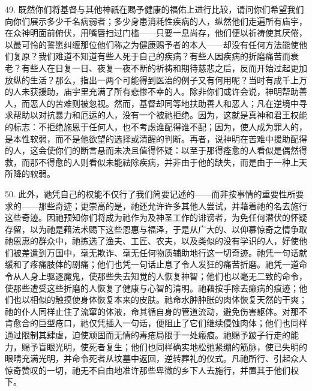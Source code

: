 49. 既然你们将基督与其他神祇在赐予健康的福佑上进行比较，请问你们希望我们向你们展示多少千名病弱者；多少身患消耗性疾病的人，纵然他们走遍所有庙宇，在众神明面前俯伏，用嘴唇扫过门槛——只要一息尚存，他们便以祈祷使其厌倦，以最可怜的誓愿纠缠那位他们称之为健康赐予者的本人——却没有任何方法能使他们复原？我们难道不知道有些人死于自己的疾病？有些人因疾病的折磨痛苦而衰老？有些人在日复一日、夜复一夜不断的祈祷和期待慈悲之后，反而开始过起更加放纵的生活？那么，指出一两个可能得到医治的例子又有何用呢？当时有成千上万的人未获援助，庙宇里充满了所有悲惨不幸的人。除非你们或许会说，神明帮助善人，而恶人的苦难则被忽视。然而，基督却同等地扶助善人和恶人；凡在逆境中寻求帮助以对抗暴力和厄运的人，没有一个被祂拒绝。因为，这就是真神和君王权能的标志：不拒绝施恩于任何人，也不考虑谁配得谁不配；因为，使人成为罪人的，是本性软弱，而不是他欲望的选择或清醒的判断。再者，说神明在苦难中援助配得的人，这会使你们的断言悬而未决且值得怀疑：以至于那得痊愈的人看似是偶然得救，而那不得愈的人则看似未能祛除疾病，并非由于他的缺失，而是由于一种上天所降的软弱。\par

50. 此外，祂凭自己的权能不仅行了我们简要记述的——而非按事情的重要性所要求的——那些奇迹；更崇高的是，祂还允许许多其他人尝试，并藉着祂的名去施行这些奇迹。因祂预知你们将成为祂作为及神圣工作的诽谤者，为免任何潜伏的怀疑存留，以为祂是藉法术赐下这些恩惠与福泽，于是从广大的、以仰慕惊奇之情争取祂恩惠的群众中，祂拣选了渔夫、工匠、农夫，以及类似的没有学识的人，好使他们被差遣到万国中，毫无欺诈、毫无任何物质辅助地行这一切奇迹。祂凭一句话就缓和了疼痛肢体的剧痛；他们也凭一句话止息了令人发狂的痛苦折磨。祂凭一道命令从人身上驱逐魔鬼，使那些失去知觉的人恢复神智；他们也以毫无二致的命令，使那些遭受这些折磨的人恢复了健康与心智的清明。祂藉按手除去癞病的痕迹；他们也以相似的触摸使身体恢复本来的皮肤。祂命水肿肿胀的肉体恢复天然的干爽；祂的仆人同样止住了流窜的体液，命其循自身的管道流动，避免伤害躯体。对那不肯愈合的巨型疮口，祂仅凭插入一句话，便阻止了它们继续侵蚀肉体；他们也同样通过限制其肆虐，迫使顽固而无情的毒疮局限于一处瘢痕。祂赐予跛子行走的能力，赐予盲眼光明，使死者复生；他们也同样确实地松弛紧绷的筋脉，使已失明的眼睛充满光明，并命令死者从坟墓中返回，逆转葬礼的仪式。凡祂所行、引起众人惊奇赞叹的一切，祂无不自由地准许那些卑微的乡下人去施行，并置其于他们权下。\par

